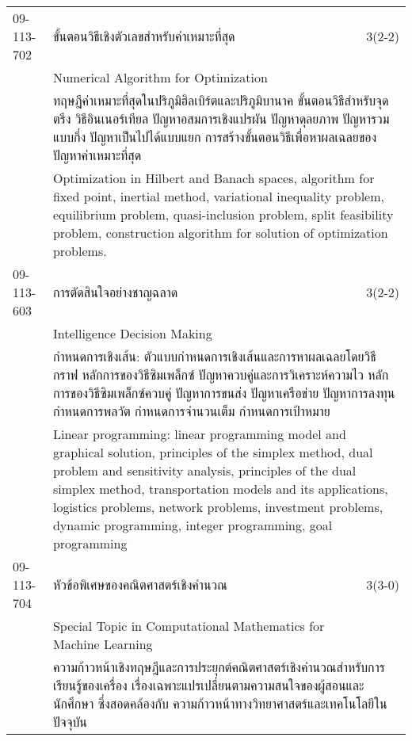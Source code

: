 \begin{longtable}{p{}p{}r{}}
09-113-702 & ขั้นตอนวิธีเชิงตัวเลขสำหรับค่าเหมาะที่สุด  & 3(2-2)\\*
 & Numerical Algorithm for Optimization & \phantom{x} \vspace{3mm} \\*
&  \multicolumn{2}{p{0.75\textwidth}}{ทฤษฎีค่าเหมาะที่สุดในปริภูมิฮิลเบิร์ตและปริภูมิบานาค ขั้นตอนวิธีสำหรับจุดตรึง วิธีอินเนอร์เทียล ปัญหาอสมการเชิงแปรผัน ปัญหาดุลยภาพ ปัญหารวมแบบกึ่ง ปัญหาเป็นไปได้แบบแยก การสร้างขั้นตอนวิธีเพื่อหาผลเฉลยของปัญหาค่าเหมาะที่สุด} \vspace{3mm} \\*
&  \multicolumn{2}{p{0.75\textwidth}}{Optimization in Hilbert and Banach spaces, algorithm for fixed point, inertial method, variational inequality problem, equilibrium problem, quasi-inclusion problem, split feasibility problem, construction algorithm for solution of optimization problems.} \vspace{8mm} \\*
09-113-603 & การตัดสินใจอย่างชาญฉลาด & 3(2-2)\\*
 & Intelligence Decision Making & \phantom{x} \vspace{3mm} \\*
&  \multicolumn{2}{p{0.75\textwidth}}{กำหนดการเชิงเส้น: ตัวแบบกำหนดการเชิงเส้นและการหาผลเฉลยโดยวิธีกราฟ หลักการของวิธีซิมเพล็กซ์ ปัญหาควบคู่และการวิเคราะห์ความไว หลักการของวิธีซิมเพล็กซ์ควบคู่ ปัญหาการขนส่ง ปัญหาเครือข่าย ปัญหาการลงทุน กำหนดการพลวัต กำหนดการจำนวนเต็ม กำหนดการเป้าหมาย} \vspace{3mm} \\*
&  \multicolumn{2}{p{0.75\textwidth}}{Linear programming: linear programming model and graphical solution, principles of the simplex method, dual problem and sensitivity analysis, principles of the dual simplex method, transportation models and its applications, logistics problems, network problems, investment problems, dynamic programming, integer programming, goal programming} \vspace{8mm} \\*
09-113-704 & หัวข้อพิเศษของคณิตศาสตร์เชิงคำนวณ  & 3(3-0)\\*
 & Special Topic in Computational Mathematics for Machine Learning & \phantom{x} \vspace{3mm} \\*
&  \multicolumn{2}{p{0.75\textwidth}}{ความก้าวหน้าเชิงทฤษฎีและการประยุกต์คณิตศาสตร์เชิงคำนวณสำหรับการเรียนรู้ของเครื่อง เรื่องเฉพาะแปรเปลี่ยนตามความสนใจของผู้สอนและนักศึกษา ซึ่งสอดคล้องกับ ความก้าวหน้าทางวิทยาศาสตร์และเทคโนโลยีในปัจจุบัน} \vspace{3mm} \\*

\end{longtable}
